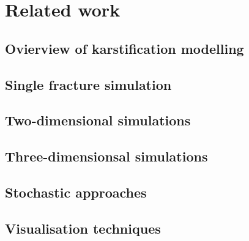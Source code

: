 \chapter{Related work}
\section{Ovierview of karstification modelling}
\section{Single fracture simulation}
\section{Two-dimensional simulations}
\section{Three-dimensionsal simulations}
\section{Stochastic approaches}
\section{Visualisation techniques}
